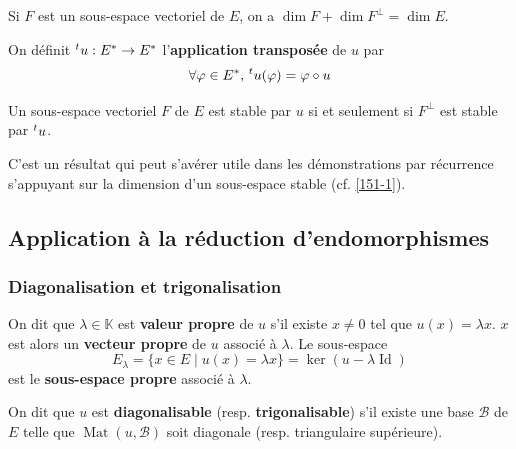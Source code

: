   \begin{proposition}
    Si $F$ est un sous-espace vectoriel de $E$, on a $\dim F + \dim F^\perp = \dim E$.
  \end{proposition}

  \begin{definition}
    On définit $\mathstrut ^t u : E^* \rightarrow E^*$ l'\textbf{application transposée} de $u$ par
    \[ \forall \varphi \in E^*, \, \mathstrut ^t u (\varphi) = \varphi \circ u \]
  \end{definition}

  \begin{proposition}
    Un sous-espace vectoriel $F$ de $E$ est stable par $u$ si et seulement si $F^\perp$ est stable par $\mathstrut ^t u$.
  \end{proposition}

  \begin{remark}
    C'est un résultat qui peut s'avérer utile dans les démonstrations par récurrence s'appuyant sur la dimension d'un sous-espace stable (cf. \cref{151-1}).
  \end{remark}

  \subsection{Application à la réduction d'endomorphismes}

  \subsubsection{Diagonalisation et trigonalisation}


  \begin{definition}
    On dit que $\lambda \in \mathbb{K}$ est \textbf{valeur propre} de $u$ s'il existe $x \neq 0$ tel que $u(x) = \lambda x$. $x$ est alors un \textbf{vecteur propre} de $u$ associé à $\lambda$. Le sous-espace
    \[ E_\lambda = \{ x \in E \mid u(x) = \lambda x \} = \ker{(u - \lambda \operatorname{Id})} \]
    est le \textbf{sous-espace propre} associé à $\lambda$.
  \end{definition}

  \begin{definition}
    On dit que $u$ est \textbf{diagonalisable} (resp. \textbf{trigonalisable}) s'il existe une base $\mathcal{B}$ de $E$ telle que $\operatorname{Mat}(u, \mathcal{B})$ soit diagonale (resp. triangulaire supérieure).
  \end{definition}

